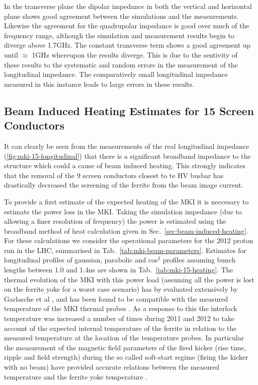 In the transverse plane the dipolar impedance in both the vertical and horizontal plane shows good agreement between the simulations and the measurements. Likewise the agreement for the quadrupolar impedance is good over much of the frequency range, although the simulation and measurement results begin to diverge above 1.7GHz. The constant transverse term shows a good agreement up until $\approx$ 1GHz whereupon the results diverge. This is due to the sentivity of these results to the systematic and random errors in the measurement of the longitudinal impedance. The comparatively small longitudinal impedance measured in this instance leads to large errors in these results. 

\subsection{Beam Induced Heating Estimates for 15 Screen Conductors}

It can clearly be seen from the measurements of the real longitudinal impedance (\ref{fig:mki-15-longitudinal}) that there is a significant broadband impedance to the structure which could a cause of beam induced heating. This strongly indicates that the removal of the 9 screen conductors closest to te HV busbar has drastically decreased the screening of the ferrite from the beam image current.

To provide a first estimate of the expected heating of the MKI it is neccesary to estimate the power loss in the MKI. Taking the simulation impedance (due to allowing a finer resolution of frequency) the power is estimated using the broadband method of heat calculation given in Sec.~\ref{sec:beam-induced-heating}. For these calculations we consider the operational parameters for the 2012 proton run in the LHC, summarised in Tab.~\ref{tab:mki-beam-parameters}. Estimates for longitudinal profiles of gaussian, parabolic and cos$^{2}$ profiles assuming bunch lengths between 1.0 and 1.4ns are shown in Tab.~\ref{tab:mki-15-heating}. The thermal evolution of the MKI with this power load (assuming all the power is lost on the ferrite yoke for a worst case scenario) has by evaluated extensively by Garlasche et al \cite{Garlasche:2dHeat}, and has been found to be compatible with the measured temperature of the MKI thermal probes \cite{Barnes:mkiHeating}. As a response to this the interlock temperature was increased a number of times during 2011 and 2012 to take account of the expected internal temperature of the ferrite in relation to the measured temperature at the location of the temperature probes. In particular the measurement of the magnetic field parameters of the fired kicker (rise time, ripple and field strength) during the so called soft-start regime (firing the kicker with no beam) have provided accurate relations between the measured temperature and the ferrite yoke temperature \cite{Barnes:mkiHeating}.

